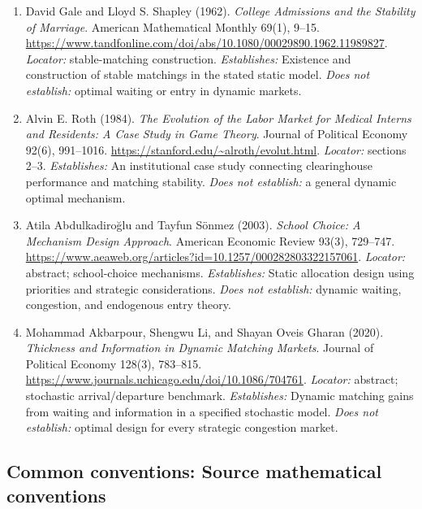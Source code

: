 \documentclass[11pt,a4paper]{article}
\begin{document}
\begin{enumerate}

\item[S1] David Gale and Lloyd S. Shapley (1962). \emph{College Admissions and the Stability of Marriage}. American Mathematical Monthly 69(1), 9--15. \url{https://www.tandfonline.com/doi/abs/10.1080/00029890.1962.11989827}. \textit{Locator:} stable-matching construction. \textit{Establishes:} Existence and construction of stable matchings in the stated static model. \textit{Does not establish:} optimal waiting or entry in dynamic markets.

\item[S2] Alvin E. Roth (1984). \emph{The Evolution of the Labor Market for Medical Interns and Residents: A Case Study in Game Theory}. Journal of Political Economy 92(6), 991--1016. \url{https://stanford.edu/~alroth/evolut.html}. \textit{Locator:} sections 2--3. \textit{Establishes:} An institutional case study connecting clearinghouse performance and matching stability. \textit{Does not establish:} a general dynamic optimal mechanism.

\item[S3] Atila Abdulkadiroğlu and Tayfun Sönmez (2003). \emph{School Choice: A Mechanism Design Approach}. American Economic Review 93(3), 729--747. \url{https://www.aeaweb.org/articles?id=10.1257/000282803322157061}. \textit{Locator:} abstract; school-choice mechanisms. \textit{Establishes:} Static allocation design using priorities and strategic considerations. \textit{Does not establish:} dynamic waiting, congestion, and endogenous entry theory.

\item[S4] Mohammad Akbarpour, Shengwu Li, and Shayan Oveis Gharan (2020). \emph{Thickness and Information in Dynamic Matching Markets}. Journal of Political Economy 128(3), 783--815. \url{https://www.journals.uchicago.edu/doi/10.1086/704761}. \textit{Locator:} abstract; stochastic arrival/departure benchmark. \textit{Establishes:} Dynamic matching gains from waiting and information in a specified stochastic model. \textit{Does not establish:} optimal design for every strategic congestion market.

\end{enumerate}

\subsection*{Common conventions: Source mathematical conventions}
\end{document}
